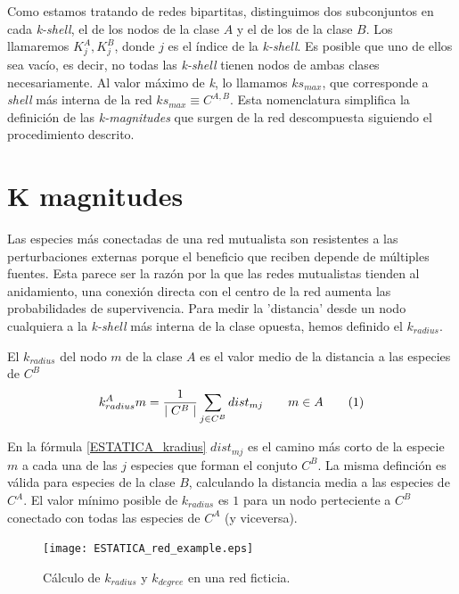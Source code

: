 Como estamos tratando de redes bipartitas, distinguimos dos subconjuntos en cada \textit{k-shell}, el de los nodos de la clase $A$ y el de los de la clase $B$. Los llamaremos $K^{A}_{j}, K^{B}_{j}$, donde  $j$ es el índice de la \textit{k-shell}.
Es posible que uno de ellos sea vacío, es decir, no todas las \textit{k-shell} tienen nodos de ambas clases necesariamente.
Al valor máximo de \textit{k}, lo llamamos $ks_{max}$, que corresponde a \textit{shell} más interna de la red $ks_{max}\equiv C^{A,B}$. Esta nomenclatura simplifica la definición de las \textit{k-magnitudes} que surgen de la red descompuesta siguiendo el procedimiento descrito.


\section{K magnitudes}

Las especies más conectadas de una red mutualista son resistentes a las perturbaciones externas porque el beneficio que reciben depende de múltiples fuentes. Esta parece ser la razón por la que las redes mutualistas tienden al anidamiento, una conexión directa con el centro de la red aumenta las probabilidades de supervivencia. Para medir la 'distancia' desde un nodo cualquiera a la \textit{k-shell} más interna de la clase opuesta, hemos definido el \textit{$k_{radius}$}.

\begin{theo} 
El \textit{$k_{radius}$} del nodo $m$ de la clase $A$ es el valor medio de la distancia a las especies de $C^B$
\begin{align*}
\displaystyle
k^A_{radius}m = \frac{1}{\mid C^{B} \mid}\sum\limits_{j \in C^{B}} dist_{mj}  \qquad   m \in A
\stepcounter{equation}\tag{\theequation}\label{kradius}
\end{align*}
\label{ESTATICA_kradius}
\end{theo}

En la fórmula \ref{ESTATICA_kradius} $dist_{mj}$ es el camino más corto de la especie $m$ a cada una de las $j$ especies que forman el conjuto $C^B$. La misma definción es válida para especies de la clase $B$, calculando la distancia media a las especies de $C^A$. El valor mínimo posible de $k_{radius}$ es $1$ para un nodo perteciente a $C^B$ conectado con todas las especies de $C^A$ (y viceversa).

\begin{figure}[h!]
\centering
\texttt{[image: ESTATICA\_red\_example.eps]}
\caption {Cálculo de \textit{$k_{radius}$} y  \textit{$k_{degree}$} en una red ficticia.}
\label{fig:ESTATICA_red_example}
\end{figure}

